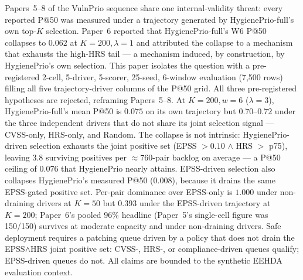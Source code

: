 Papers~5--8 of the VulnPrio sequence share one internal-validity
threat: every reported P@50 was measured under a trajectory generated
by HygienePrio-full's own top-$K$ selection. Paper~6 reported that
HygienePrio-full's W6 P@50 collapses to $0.062$ at
$K = 200, \lambda = 1$ and attributed the collapse to a mechanism that
exhausts the high-HRS tail --- a mechanism induced, by construction,
by HygienePrio's own selection. This paper isolates the question with
a pre-registered 2-cell, 5-driver, 5-scorer, 25-seed, 6-window
evaluation (7{,}500 rows) filling all five trajectory-driver columns
of the P@50 grid. All three pre-registered hypotheses are rejected,
reframing Papers~5--8. At $K = 200, w = 6$ ($\lambda = 3$),
HygienePrio-full's mean P@50 is $0.075$ on its own trajectory but
$0.70$--$0.72$ under the three independent drivers that do not share
its joint selection signal --- CVSS-only, HRS-only, and Random. The
collapse is not intrinsic: HygienePrio-driven selection exhausts the
joint positive set (EPSS $> 0.10$ $\wedge$ HRS $>$ p75), leaving
$3.8$ surviving positives per $\approx 760$-pair backlog on average
--- a P@50 ceiling of $0.076$ that HygienePrio nearly attains.
EPSS-driven selection also collapses HygienePrio's measured P@50
($0.008$), because it drains the same EPSS-gated positive set.
Per-pair dominance over EPSS-only is $1.000$ under non-draining
drivers at $K = 50$ but $0.393$ under the EPSS-driven trajectory at
$K = 200$; Paper~6's pooled $96\%$ headline (Paper~5's single-cell
figure was 150/150) survives at moderate capacity and under
non-draining drivers. Safe deployment requires a patching queue
driven by a policy that does not drain the EPSS$\wedge$HRS joint
positive set: CVSS-, HRS-, or compliance-driven queues qualify;
EPSS-driven queues do not. All claims are bounded to the synthetic
EEHDA evaluation context.
